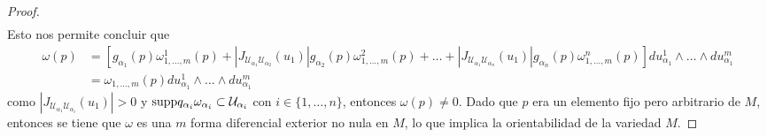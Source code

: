 \documentclass[10pt,a4paper]{report}
\begin{document}
\begin{proof}
\begin{align*}
       \end{align*}
       Esto nos permite concluir que 
       \begin{align*}
       	\omega(p) &=\left[  g_{\alpha_{1}}(p)\omega_{1,\dots,m}^{1}(p) +  \left| J_{\mathcal{U}_{\alpha_{1}}\mathcal{U}_{\alpha_{2}}} (u_{1})\right|g_{\alpha_{2}}(p)\omega_{1,\dots,m}^{2}(p) + \dots +\left| J_{\mathcal{U}_{\alpha_{1}}\mathcal{U}_{\alpha_{n}}} (u_{1})\right| g_{\alpha_{n}}(p)\omega_{1,\dots,m}^{n}(p)  \right] du^{1}_{\alpha_{1}}\wedge \dots\wedge du^{m}_{\alpha_{1}}\\
       	&= \omega_{1,\dots,m}(p)du^{1}_{\alpha_{1}}\wedge \dots\wedge du^{m}_{\alpha_{1}}
       \end{align*}
       como $\left| J_{\mathcal{U}_{\alpha_{1}}\mathcal{U}_{\alpha_{i}}}(u_{1}) \right| >0$ y $\textup{supp}q_{\alpha_{i}}\omega_{\alpha_{i}}\subset \mathcal{U}_{\alpha_{i}}$ con $i\in\{1,\dots,n\}$, entonces $\omega(p) \neq 0$. Dado que $p$ era un elemento fijo pero arbitrario de $M$, entonces se tiene que $\omega$ es una $m$ forma diferencial exterior no nula en $M$, lo que implica la orientabilidad de la variedad $M$.
	\end{proof}
\end{document}
